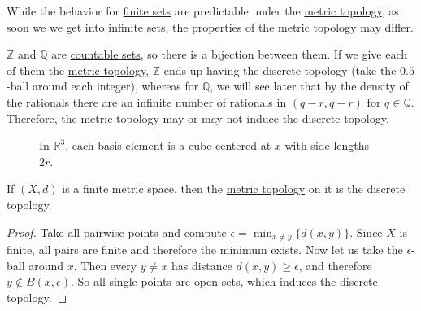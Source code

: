   While the behavior for \hyperref[st-def:finite-set]{finite sets} are predictable under the \hyperref[def:metric-topology]{metric topology}, as soon we we get into \hyperref[st-def:infinite-set]{infinite sets}, the properties of the metric topology may differ. 

  \begin{example}
    \label{ex:metric-topologies-on-z-and-q}
    $\mathbb{Z}$ and $\mathbb{Q}$ are \hyperref[st-def:countable]{countable sets}, so there is a bijection between them. If we give each of them the \hyperref[def:metric-topology]{metric topology}, $\mathbb{Z}$ ends up having the discrete topology (take the $0.5$-ball around each integer), whereas for $\mathbb{Q}$, we will see later that by the density of the rationals there are an infinite number of rationals in $(q - r, q + r)$ for $q \in \mathbb{Q}$. Therefore, the metric topology may or may not induce the discrete topology. 
  \end{example}

  \begin{example}
    \label{ex:supremum-norm-in-r3}
    \begin{figure}[H]
      \centering 
      \caption{In $\mathbb{R}^3$, each basis element is a cube centered at $x$ with side lengths $2r$.} 
      \label{fig:sup_norm_R3}
    \end{figure}
  \end{example}

  \begin{theorem}
    \label{thm:metric-topologies-on-finite-sets}
    If $(X, d)$ is a finite metric space, then the \hyperref[def:metric-topology]{metric topology} on it is the discrete topology. 
  \end{theorem}
  \begin{proof}
    Take all pairwise points and compute $\epsilon = \min_{x \neq y} \{d(x, y)\}$. Since $X$ is finite, all pairs are finite and therefore the minimum exists. Now let us take the $\epsilon$-ball around $x$. Then every $y \neq x$ has distance $d(x, y) \geq \epsilon$, and therefore $y \not\in B(x, \epsilon)$. So all single points are \hyperref[def:open-set]{open sets}, which induces the discrete topology. 
  \end{proof}

